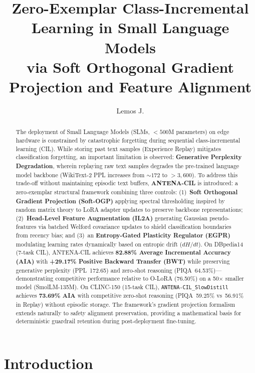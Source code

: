 \documentclass[11pt,a4paper]{article}
\title{Zero-Exemplar Class-Incremental Learning in Small Language Models\\via Soft Orthogonal Gradient Projection and Feature Alignment}
\author{Lemos J.}
\affil{Independent Researcher}
\date{}
\begin{document}
\maketitle

\begin{abstract}
The deployment of Small Language Models (SLMs, ${<}500$M parameters) on edge hardware is constrained by catastrophic forgetting during sequential class-incremental learning (CIL). While storing past text samples (Experience Replay) mitigates classification forgetting, an important limitation is observed: \textbf{Generative Perplexity Degradation}, wherein replaying raw text samples degrades the pre-trained language model backbone (WikiText-2 PPL increases from ${\sim}172$ to ${>}3{,}600$). To address this trade-off without maintaining episodic text buffers, \textbf{ANTENA-CIL} is introduced: a zero-exemplar structural framework combining three controls: (1)~\textbf{Soft Orthogonal Gradient Projection (Soft-OGP)} applying spectral thresholding inspired by random matrix theory to LoRA adapter updates to preserve backbone representations; (2)~\textbf{Head-Level Feature Augmentation (IL2A)} generating Gaussian pseudo-features via batched Welford covariance updates to shield classification boundaries from recency bias; and (3)~an \textbf{Entropy-Gated Plasticity Regulator (EGPR)} modulating learning rates dynamically based on entropic drift ($dH/dt$). On DBpedia14 (7-task CIL), ANTENA-CIL achieves \textbf{82.88\% Average Incremental Accuracy (AIA)} with \textbf{+29.17\% Positive Backward Transfer (BWT)} while preserving generative perplexity (PPL~172.65) and zero-shot reasoning (PIQA~64.53\%)---demonstrating competitive performance relative to O-LoRA (76.50\%) on a 50$\times$ smaller model (SmolLM-135M). On CLINC-150 (15-task CIL), \texttt{ANTENA-CIL\_SlowDistill} achieves \textbf{73.69\% AIA} with competitive zero-shot reasoning (PIQA~59.25\% vs~56.91\% in Replay) without episodic storage. The framework's gradient projection formalism extends naturally to safety alignment preservation, providing a mathematical basis for deterministic guardrail retention during post-deployment fine-tuning.
\end{abstract}

\section{Introduction}
\end{document}
